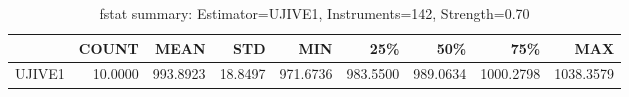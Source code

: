 \begin{table}[ht]
\centering
\caption{fstat summary: Estimator=UJIVE1, Instruments=142, Strength=0.70}
\begin{tabular}{lrrrrrrrr}
\toprule
 & COUNT & MEAN & STD & MIN & 25\% & 50\% & 75\% & MAX \\
\midrule
UJIVE1 & 10.0000 & 993.8923 & 18.8497 & 971.6736 & 983.5500 & 989.0634 & 1000.2798 & 1038.3579 \\
\bottomrule
\end{tabular}
\end{table}
